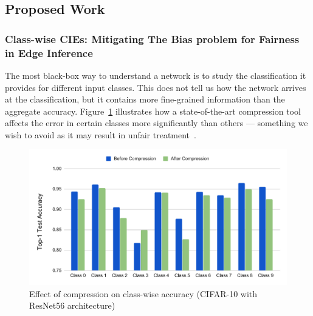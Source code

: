 \subsection{Proposed Work}

\subsubsection{Class-wise CIEs: Mitigating The Bias problem for Fairness in Edge Inference}
The most black-box way to understand a network is to study the classification it provides for different input classes.  This does not tell us how the network arrives at the classification, but it contains more fine-grained information than the aggregate accuracy.  Figure~\ref{fig:r56Output-class-wise} illustrates 
how a state-of-the-art compression tool~\cite{joseph2019programmable} affects the error in certain classes more significantly than others --- something we wish to avoid as it may result in unfair treatment~\cite{hooker2019selective}. 

\begin{figure}[!h]
    \centering
    \includegraphics[width=\linewidth,clip,trim=0 .25in 0 0]{img/class-impact.pdf}
    \caption{\small Effect of compression on class-wise accuracy (CIFAR-10 with ResNet56 architecture)}
    \label{fig:r56Output-class-wise}
\end{figure}

